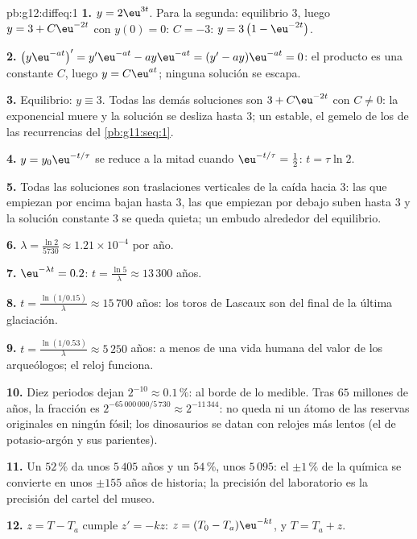 \begin{solution}{pb:g12:diffeq:1}
\textbf{1.} $y = 2\eu^{3t}$. Para la segunda: equilibrio $3$, luego
$y = 3 + C\eu^{-2t}$ con $y(0) = 0$: $C = -3$:
$y = 3\left(1 - \eu^{-2t}\right)$.

\textbf{2.} $\left(y\eu^{-at}\right)' = y'\eu^{-at} - ay\eu^{-at} =
(y' - ay)\eu^{-at} = 0$: el producto es una constante $C$, luego
$y = C\eu^{at}$; ninguna solución se escapa.

\textbf{3.} Equilibrio: $y \equiv 3$. Todas las demás soluciones son
$3 + C\eu^{-2t}$ con $C \neq 0$: la exponencial muere y la solución se
desliza hasta $3$; un  estable, el gemelo  de los  de las recurrencias del \cref{pb:g11:seq:1}.

\textbf{4.} $y = y_0\eu^{-t/\tau}$ se reduce a la mitad cuando
$\eu^{-t/\tau} = \frac12$: $t = \tau\ln 2$.

\textbf{5.} Todas las soluciones son traslaciones verticales de la caída
hacia $3$: las que empiezan por encima bajan hasta $3$, las que empiezan
por debajo suben hasta $3$ y la solución constante $3$ se queda quieta; un
embudo alrededor del equilibrio.

\textbf{6.} $\lambda = \frac{\ln 2}{5730} \approx 1.21 \times 10^{-4}$ por
año.

\textbf{7.} $\eu^{-\lambda t} = 0.2$:
$t = \frac{\ln 5}{\lambda} \approx 13\,300$ años.

\textbf{8.} $t = \frac{\ln(1/0.15)}{\lambda} \approx 15\,700$ años: los
toros de Lascaux son del final de la última glaciación.

\textbf{9.} $t = \frac{\ln(1/0.53)}{\lambda} \approx 5\,250$ años: a menos
de una vida humana del valor de los arqueólogos; el reloj funciona.

\textbf{10.} Diez periodos dejan $2^{-10} \approx 0.1\,\%$: al borde de lo
medible. Tras $65$ millones de años, la fracción es
$2^{-65\,000\,000/5\,730} \approx 2^{-11\,344}$: no queda ni un átomo de
las reservas originales en ningún fósil; los dinosaurios se datan con
relojes más lentos (el de potasio-argón y sus parientes).

\textbf{11.} Un $52\,\%$ da unos $5\,405$ años y un $54\,\%$, unos
$5\,095$: el $\pm 1\,\%$ de la química se convierte en unos $\pm 155$ años
de historia; la precisión del laboratorio es la precisión del cartel del
museo.

\textbf{12.} $z = T - T_a$ cumple $z' = -kz$:
$z = (T_0 - T_a)\eu^{-kt}$, y $T = T_a + z$.


\end{solution}
